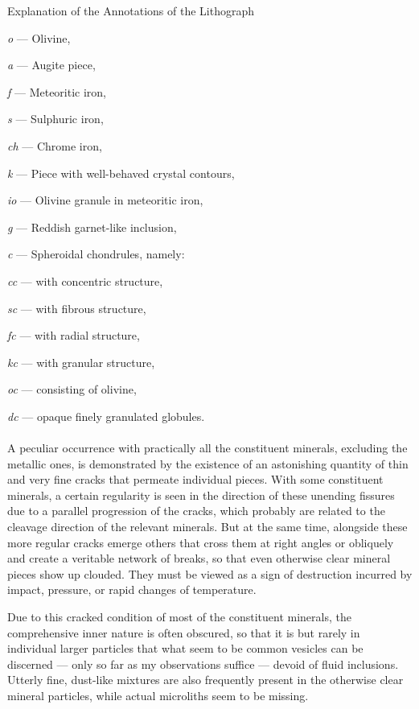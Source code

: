 \documentclass[a4paper, 12pt, oneside]{article}
\begin{document}
Explanation of the Annotations of the Lithograph\\
\begin{minipage}[t]{0.54\textwidth}
\emph{o} --- Olivine,

\emph{a} --- Augite piece,

\emph{f} --- Meteoritic iron,

\emph{s} --- Sulphuric iron,

\emph{ch} --- Chrome iron,

\emph{k} --- Piece with well-behaved crystal contours,

\emph{io} --- Olivine granule in meteoritic iron,

\emph{g} --- Reddish garnet-like inclusion,
\end{minipage}
\begin{minipage}[t]{0.46\textwidth}
\emph{c} --- Spheroidal chondrules, namely:

\emph{cc} --- with concentric structure,

\emph{sc} --- with fibrous structure,

\emph{fc} --- with radial structure,

\emph{kc} --- with granular structure,

\emph{oc} --- consisting of olivine,

\emph{dc} --- opaque finely granulated globules.
\end{minipage}
\paragraph*{}
A peculiar occurrence with practically all the constituent minerals, excluding the metallic ones, is demonstrated by the existence of an astonishing quantity of thin and very fine cracks that permeate individual pieces. With some constituent minerals, a certain regularity is seen in the direction of these unending fissures due to a parallel progression of the cracks, which probably are related to the cleavage direction of the relevant minerals. But at the same time, alongside these more regular cracks emerge others that cross them at right angles or obliquely and create a veritable network of breaks, so that even otherwise clear mineral pieces show up clouded. They must be viewed as a sign of destruction incurred by impact, pressure, or rapid changes of temperature.

Due to this cracked condition of most of the constituent minerals, the comprehensive inner nature is often obscured, so that it is but rarely in individual larger particles that what seem to be common vesicles can be discerned --- only so far as my observations suffice --- devoid of fluid inclusions. Utterly fine, dust-like mixtures are also frequently present in the otherwise clear mineral particles, while actual microliths seem to be missing.
\end{document}
